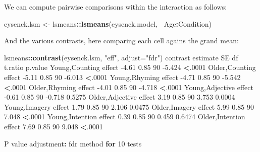 \documentclass[]{article}
\newenvironment{Shaded}{\begin{snugshade}}{\end{snugshade}}
\newcommand{\ControlFlowTok}[1]{\textcolor[rgb]{0.13,0.29,0.53}{\textbf{#1}}}
\newcommand{\DataTypeTok}[1]{\textcolor[rgb]{0.13,0.29,0.53}{#1}}
\newcommand{\DecValTok}[1]{\textcolor[rgb]{0.00,0.00,0.81}{#1}}
\newcommand{\FloatTok}[1]{\textcolor[rgb]{0.00,0.00,0.81}{#1}}
\newcommand{\KeywordTok}[1]{\textcolor[rgb]{0.13,0.29,0.53}{\textbf{#1}}}
\newcommand{\NormalTok}[1]{#1}
\newcommand{\OperatorTok}[1]{\textcolor[rgb]{0.81,0.36,0.00}{\textbf{#1}}}
\newcommand{\StringTok}[1]{\textcolor[rgb]{0.31,0.60,0.02}{#1}}
\begin{document}
We can compute pairwise comparisons within the interaction as follows:

\begin{Shaded}
\begin{Highlighting}[]
\NormalTok{eysenck.lsm <-}\StringTok{ }\NormalTok{lsmeans}\OperatorTok{::}\KeywordTok{lsmeans}\NormalTok{(eysenck.model, }\OperatorTok{~}\NormalTok{Age}\OperatorTok{:}\NormalTok{Condition)}
\end{Highlighting}
\end{Shaded}

And the various contrasts, here comparing each cell agains the grand mean:

\begin{Shaded}
\begin{Highlighting}[]
\NormalTok{lsmeans}\OperatorTok{::}\KeywordTok{contrast}\NormalTok{(eysenck.lsm, }\StringTok{"eff"}\NormalTok{, }\DataTypeTok{adjust=}\StringTok{"fdr"}\NormalTok{)}
\NormalTok{ contrast               estimate   SE df t.ratio p.value}
\NormalTok{ Young,Counting effect     }\FloatTok{-4.61} \FloatTok{0.85} \DecValTok{90} \FloatTok{-5.424}  \OperatorTok{<}\NormalTok{.}\DecValTok{0001} 
\NormalTok{ Older,Counting effect     }\FloatTok{-5.11} \FloatTok{0.85} \DecValTok{90} \FloatTok{-6.013}  \OperatorTok{<}\NormalTok{.}\DecValTok{0001} 
\NormalTok{ Young,Rhyming effect      }\FloatTok{-4.71} \FloatTok{0.85} \DecValTok{90} \FloatTok{-5.542}  \OperatorTok{<}\NormalTok{.}\DecValTok{0001} 
\NormalTok{ Older,Rhyming effect      }\FloatTok{-4.01} \FloatTok{0.85} \DecValTok{90} \FloatTok{-4.718}  \OperatorTok{<}\NormalTok{.}\DecValTok{0001} 
\NormalTok{ Young,Adjective effect    }\FloatTok{-0.61} \FloatTok{0.85} \DecValTok{90} \FloatTok{-0.718}  \FloatTok{0.5275} 
\NormalTok{ Older,Adjective effect     }\FloatTok{3.19} \FloatTok{0.85} \DecValTok{90}  \FloatTok{3.753}  \FloatTok{0.0004} 
\NormalTok{ Young,Imagery effect       }\FloatTok{1.79} \FloatTok{0.85} \DecValTok{90}  \FloatTok{2.106}  \FloatTok{0.0475} 
\NormalTok{ Older,Imagery effect       }\FloatTok{5.99} \FloatTok{0.85} \DecValTok{90}  \FloatTok{7.048}  \OperatorTok{<}\NormalTok{.}\DecValTok{0001} 
\NormalTok{ Young,Intention effect     }\FloatTok{0.39} \FloatTok{0.85} \DecValTok{90}  \FloatTok{0.459}  \FloatTok{0.6474} 
\NormalTok{ Older,Intention effect     }\FloatTok{7.69} \FloatTok{0.85} \DecValTok{90}  \FloatTok{9.048}  \OperatorTok{<}\NormalTok{.}\DecValTok{0001} 

\NormalTok{P value adjustment}\OperatorTok{:}\StringTok{ }\NormalTok{fdr method }\ControlFlowTok{for} \DecValTok{10}\NormalTok{ tests }
\end{Highlighting}
\end{Shaded}
\end{document}

